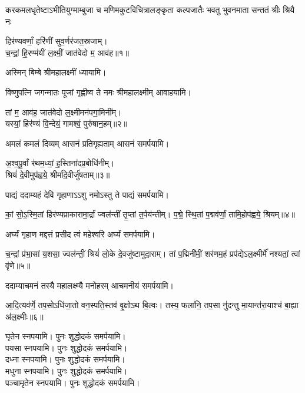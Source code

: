 \begin{center}

{करकमलधृतेष्टाऽभीतियुग्माम्बुजा च}
{मणिमकुटविचित्रालङ्कृता कल्पजातैः}
{भवतु भुवनमाता सन्ततं श्रीः श्रियै नः}

हिर॑ण्यवर्णां॒ हरि॑णीं सुव॒र्णर॑जत॒स्रजाम्।\\
च॒न्द्रां॒ हि॒रण्म॑यीं ल॒क्ष्मीं॒ जात॑वेदो म॒ आव॑ह॥१॥

अस्मिन् बिम्बे श्रीमहालक्ष्मीं ध्यायामि।

{विष्णुपत्नि जगन्मातः पूजां गृह्णीष्व ते नमः}
श्रीमहालक्ष्मीम् आवाहयामि।

तां म॒ आव॑ह॒ जात॑वेदो ल॒क्ष्मीमन॑पगा॒मिनी᳚म्।\\
यस्यां॒ हिर॑ण्यं वि॒न्देयं॒ गामश्वं॒ पुरु॑षान॒हम्॥२॥


{अमलं कमलं दिव्यम् आसनं प्रतिगृह्यताम्}
 आसनं समर्पयामि।\medskip

अ॒श्व॒पू॒र्वां र॑थम॒ध्यां॒ ह॒स्तिना॑दप्र॒बोधि॑नीम्।\\
श्रियं॑ दे॒वीमुप॑ह्वये॒ श्रीर्मा॑दे॒वीर्जु॑षताम्॥३॥


{पाद्यं ददाम्यहं देवि गृहाणाऽऽशु नमोऽस्तु ते}
 पाद्यं समर्पयामि।\medskip

कां॒ सो॒ऽ॒स्मि॒तां हिर॑ण्यप्राकारामा॒र्द्रां ज्वल॑न्तीं तृ॒प्तां त॒र्पय॑न्तीम्।
प॒द्मे॒ स्थि॒तां प॒द्मव॑र्णां॒ तामि॒होप॑ह्वये॒ श्रियम्॥४॥

{अर्घ्यं गृहाण मद्दत्तं प्रसीद त्वं महेश्वरि}
 अर्घ्यं समर्पयामि।\medskip

च॒न्द्रां प्र॑भा॒सां य॒शसा॒ ज्वल॑न्तीं॒ श्रियं॑ लो॒के दे॒वजु॑ष्टामुदा॒राम्।
तां प॒द्मिनी॑मीं॒ शर॑णम॒हं प्रप॑द्येऽल॒क्ष्मीर्मे॑ नश्यतां॒ त्वां वृ॑णे॥५॥


{ददाम्याचमनं तस्यै महालक्ष्म्यै मनोहरम्}
 आचमनीयं समर्पयामि।\medskip

 आ॒दि॒त्यव॑र्णे॒ तप॒सोऽधि॑जा॒तो वन॒स्पति॒स्तव॑ वृ॒क्षोऽथ बि॒ल्वः।
तस्य॒ फला॑नि॒ तप॒सा नु॑दन्तु मा॒यान्त॑रा॒याश्च॑ बा॒ह्या अ॑ल॒क्ष्मीः॥६॥


घृतेन स्नपयामि। पुनः शुद्धोदकं समर्पयामि।\\
पयसा स्नपयामि। पुनः शुद्धोदकं समर्पयामि।\\
दध्ना स्नपयामि। पुनः शुद्धोदकं समर्पयामि।\\
मधुना स्नपयामि। पुनः शुद्धोदकं समर्पयामि।\\
पञ्चामृतेन स्नपयामि। पुनः शुद्धोदकं समर्पयामि।


\end{center}
